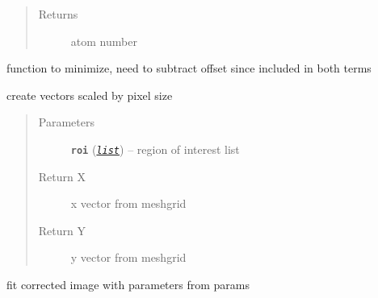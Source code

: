 \documentclass[letterpaper,10pt,english]{sphinxmanual}
\begin{document}
\begin{fulllineitems}
\begin{fulllineitems}
\begin{quote}
\begin{description}
\begin{itemize}
\end{itemize}

\item[{Returns}] \leavevmode
atom number

\end{description}\end{quote}

\end{fulllineitems}


\begin{fulllineitems}
\label{fit_object:Fitobject.fit_object.bimod2min}
function to minimize, need to subtract offset since included
in both terms

\end{fulllineitems}


\begin{fulllineitems}
\label{fit_object:Fitobject.fit_object.create_vecs}
create vectors scaled by pixel size
\begin{quote}\begin{description}
\item[{Parameters}] \leavevmode
\textbf{\texttt{roi}} (\href{https://docs.python.org/library/functions.html\#list}{\emph{\texttt{list}}}) -- region of interest list

\item[{Return X}] \leavevmode
x vector from meshgrid

\item[{Return Y}] \leavevmode
y vector from meshgrid

\end{description}\end{quote}

\end{fulllineitems}


\begin{fulllineitems}
\label{fit_object:Fitobject.fit_object.fit_image}
fit corrected image with parameters from params

\end{fulllineitems}


\end{fulllineitems}
\end{document}
